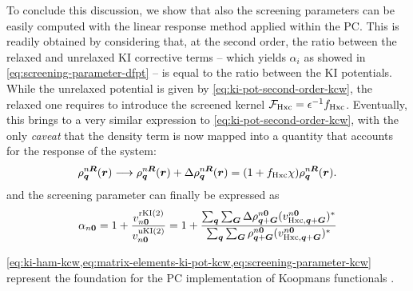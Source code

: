 To conclude this discussion, we show that also the screening parameters can be easily computed with the linear response method applied within the PC. This is readily obtained by considering that, at the second order, the ratio between the relaxed and unrelaxed KI corrective terms -- which yields $\alpha_i$ as showed in \cref{eq:screening-parameter-dfpt} -- is equal to the ratio between the KI potentials. While the unrelaxed potential  is given by \cref{eq:ki-pot-second-order-kcw}, the relaxed one requires to introduce the screened kernel $\mathcal{F}_{\rm Hxc} = \epsilon^{-1} f_{\rm Hxc}$. Eventually, this brings to a very similar expression to \cref{eq:ki-pot-second-order-kcw}, with the only \emph{caveat} that the density term is now mapped into a quantity that accounts for the response of the system:
%
\begin{equation}
    \rho_{{\bm q}}^{n{\bm R}}({\bm r}) \longrightarrow \rho_{{\bm q}}^{n{\bm R}}({\bm r}) + \Delta \rho_{{\bm q}}^{n{\bm R}}({\bm r}) = (1 + f_{\rm Hxc} \chi) \rho_{{\bm q}}^{n{\bm R}}({\bm r}) .
    \label{eq:response-density-kcw}
\end{equation}
%
and the screening parameter can finally be expressed as
%
\begin{equation}
    \alpha_{n{\bm 0}} = 1 + \frac{v^{\rm rKI(2)}_{n{\bm 0}}}{v^{\rm uKI(2)}_{n{\bm 0}}} 
    = 1 + \frac{\sum_{{\bm q}} \sum_{{\bm G}} \Delta \rho_{{\bm q}+{\bm G}}^{n {\bm 0}} (v_{{\rm Hxc},{\bm q}+{\bm G}}^{n{\bm 0}})^*}{\sum_{{\bm q}} \sum_{{\bm G}} \rho_{{\bm q}+{\bm G}}^{n {\bm 0}} (v_{{\rm Hxc},{\bm q}+{\bm G}}^{n{\bm 0}})^*}
    \label{eq:screening-parameter-kcw}
\end{equation}

\cref{eq:ki-ham-kcw,eq:matrix-elements-ki-pot-kcw,eq:screening-parameter-kcw} represent the foundation for the PC implementation of Koopmans functionals \cite{colonna_koopmans_2022}.

\clearpage
